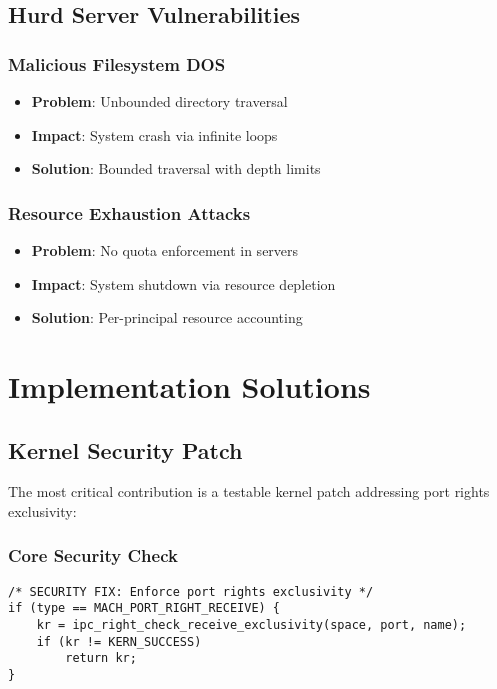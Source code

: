 \documentclass[11pt,a4paper]{article}
\begin{document}
\subsection{Hurd Server Vulnerabilities}

\subsubsection{Malicious Filesystem DOS}
\begin{itemize}
    \item \textbf{Problem}: Unbounded directory traversal
    \item \textbf{Impact}: System crash via infinite loops
    \item \textbf{Solution}: Bounded traversal with depth limits
\end{itemize}

\subsubsection{Resource Exhaustion Attacks}
\begin{itemize}
    \item \textbf{Problem}: No quota enforcement in servers
    \item \textbf{Impact}: System shutdown via resource depletion
    \item \textbf{Solution}: Per-principal resource accounting
\end{itemize}

\section{Implementation Solutions}

\subsection{Kernel Security Patch}

The most critical contribution is a testable kernel patch addressing port rights exclusivity:

\subsubsection{Core Security Check}

\begin{lstlisting}[style=cstyle, caption=Kernel Security Enhancement]
/* SECURITY FIX: Enforce port rights exclusivity */
if (type == MACH_PORT_RIGHT_RECEIVE) {
    kr = ipc_right_check_receive_exclusivity(space, port, name);
    if (kr != KERN_SUCCESS)
        return kr;
}
\end{lstlisting}
\end{document}
